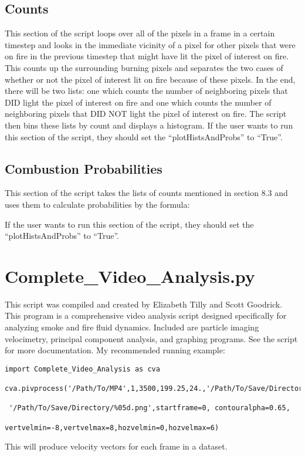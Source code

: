 \documentclass{article}
\begin{document}
\subsection{Counts}

This section of the script loops over all of the pixels in a frame in a certain timestep and looks in the immediate vicinity of a pixel for other pixels that were on fire in the previous timestep that might have lit the pixel of interest on fire. This counts up the surrounding burning pixels and separates the two cases of whether or not the pixel of interest lit on fire because of these pixels. In the end, there will be two lists: one which counts the number of neighboring pixels that DID light the pixel of interest on fire and one which counts the number of neighboring pixels that DID NOT light the pixel of interest on fire. The script then bins these lists by count and displays a histogram. If the user wants to run this section of the script, they should set the ``plotHistsAndProbs'' to ``True''. 

\subsection{Combustion Probabilities}

This section of the script takes the lists of counts mentioned in section 8.3 and uses them to calculate probabilities by the formula:



If the user wants to run this section of the script, they should set the ``plotHistsAndProbs'' to ``True''. 

\section{Complete\_Video\_Analysis.py}
This script was compiled and created by Elizabeth Tilly and Scott Goodrick. This program is a comprehensive video analysis script designed specifically for analyzing smoke and fire fluid dynamics. Included are particle imaging velocimetry, principal component analysis, and graphing programs. See the script for more documentation. My recommended running example:

\begin{lstlisting}
import Complete_Video_Analysis as cva

cva.pivprocess('/Path/To/MP4',1,3500,199.25,24.,'/Path/To/Save/Directory/%05d.npz',

 '/Path/To/Save/Directory/%05d.png',startframe=0, contouralpha=0.65,

vertvelmin=-8,vertvelmax=8,hozvelmin=0,hozvelmax=6)        

\end{lstlisting}

This will produce velocity vectors for each frame in a dataset.
\end{document}
